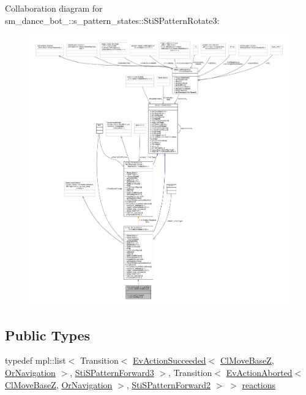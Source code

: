 Collaboration diagram for sm\+\_\+dance\+\_\+bot\+\_\+:\+:s\+\_\+pattern\+\_\+states\+:\+:Sti\+S\+Pattern\+Rotate3\+:
\nopagebreak
\begin{figure}[H]
\begin{center}
\leavevmode
\includegraphics[width=350pt]{structsm__dance__bot__2_1_1s__pattern__states_1_1StiSPatternRotate3__coll__graph}
\end{center}
\end{figure}
\subsection*{Public Types}
\begin{DoxyCompactItemize}
\item 
typedef mpl\+::list$<$ Transition$<$ \hyperlink{structsmacc_1_1default__events_1_1EvActionSucceeded}{Ev\+Action\+Succeeded}$<$ \hyperlink{classcl__move__base__z_1_1ClMoveBaseZ}{Cl\+Move\+BaseZ}, \hyperlink{classsm__dance__bot__2_1_1OrNavigation}{Or\+Navigation} $>$, \hyperlink{structsm__dance__bot__2_1_1s__pattern__states_1_1StiSPatternForward3}{Sti\+S\+Pattern\+Forward3} $>$, Transition$<$ \hyperlink{structsmacc_1_1default__events_1_1EvActionAborted}{Ev\+Action\+Aborted}$<$ \hyperlink{classcl__move__base__z_1_1ClMoveBaseZ}{Cl\+Move\+BaseZ}, \hyperlink{classsm__dance__bot__2_1_1OrNavigation}{Or\+Navigation} $>$, \hyperlink{structsm__dance__bot__2_1_1s__pattern__states_1_1StiSPatternForward2}{Sti\+S\+Pattern\+Forward2} $>$ $>$ \hyperlink{structsm__dance__bot__2_1_1s__pattern__states_1_1StiSPatternRotate3_a4a91ddf822cb87636206ed69a5f216b4}{reactions}
\end{DoxyCompactItemize}
